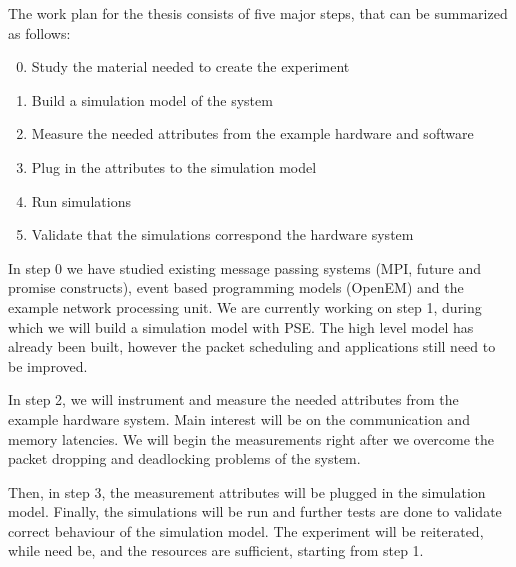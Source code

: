 The work plan for the thesis consists of five major steps, that can be summarized as follows:

\begin{enumerate}
\setcounter{enumi}{-1}
\item Study the material needed to create the experiment
\item Build a simulation model of the system
\item Measure the needed attributes from the example hardware and software
\item Plug in the attributes to the simulation model
\item Run simulations
\item Validate that the simulations correspond the hardware system
\end{enumerate}

In step 0 we have studied existing message passing systems (MPI, future and promise constructs), event based programming models (OpenEM) and the example network processing unit. We are currently working on step 1, during which we will build a simulation model with PSE. The high level model has already been built, however the packet scheduling and applications still need to be improved.

In step 2, we will instrument and measure the needed attributes from the example hardware system. Main interest will be on the communication and memory latencies. We will begin the measurements right after we overcome the packet dropping and deadlocking problems of the system.

Then, in step 3, the measurement attributes will be plugged in the simulation model. Finally, the simulations will be run and further tests are done to validate correct behaviour of the simulation model. The experiment will be reiterated, while need be, and the resources are sufficient, starting from step 1.

